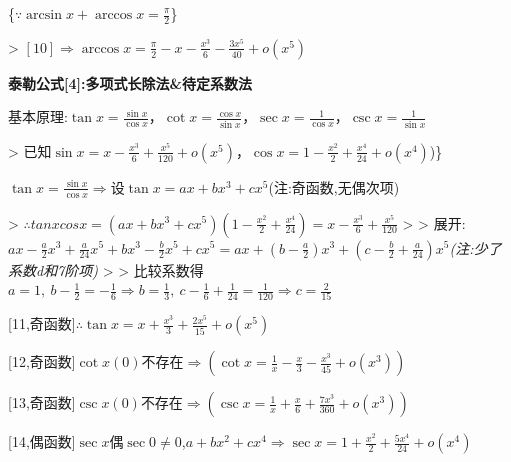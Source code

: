 \documentclass[11pt,a4paper,UTF8]{ctexart}
\begin{document}
    \{$\because\arcsin x + \arccos x = \frac{\pi}{2}$\}

\begin{solbox}[{分步推导与答题规范}]
    >   $[10]\Rightarrow \arccos x = \frac{\pi}{2} - x - \frac{x^3}{6} - \frac{3x^5}{40} + o(x^5)$
\end{solbox}

    \textbf{泰勒公式[4]:多项式长除法\&待定系数法}

    基本原理:$\tan x = \frac{\sin x}{\cos x}$，$\cot x = \frac{\cos x}{\sin x}$，$\sec x = \frac{1}{\cos x}$，$\csc x = \frac{1}{\sin x}$

\begin{solbox}[{分步推导与答题规范}]
    >   已知$\sin x = x - \frac{x^3}{6} + \frac{x^5}{120} + o(x^5)$，$\cos x = 1 - \frac{x^2}{2} + \frac{x^4}{24} + o(x^4)$)\}
\end{solbox}

    $\tan x = \frac{\sin x}{\cos x} \Rightarrow$设$\tan x = ax + bx^3 + cx^5$(注:奇函数,无偶次项)

\begin{solbox}[{分步推导与答题规范}]
    >   $\therefore tanxcosx = (ax + bx^3 + cx^5)(1 - \frac{x^2}{2} + \frac{x^4}{24}) = x - \frac{x^3}{6} + \frac{x^5}{120}$
    >
    >   展开:$ax - \frac{a}{2}x^3 + \frac{a}{24}x^5 + bx^3 - \frac{b}{2}x^5 + cx^5 = ax + (b-\frac{a}{2})x^3 + (c-\frac{b}{2}+\frac{a}{24})x^5$\textit{(注:少了系数d和7阶项)}
    >
    >   比较系数得$a=1,\ b-\frac{1}{2}=-\frac{1}{6} \Rightarrow b=\frac{1}{3},\ c-\frac{1}{6}+\frac{1}{24}=\frac{1}{120} \Rightarrow c=\frac{2}{15}$
\end{solbox}

    [11,奇函数]$\therefore \tan x = x + \frac{x^3}{3} + \frac{2x^5}{15} + o(x^5)$

    [12,奇函数]$\cot x(0)$不存在$\Rightarrow (\cot x = \frac{1}{x} - \frac{x}{3} - \frac{x^3}{45} + o(x^3))$

    [13,奇函数]$\csc x(0)$不存在$\Rightarrow (\csc x = \frac{1}{x} + \frac{x}{6} + \frac{7x^3}{360} + o(x^3))$

    [14,偶函数]$\sec x$偶$\sec 0 \neq 0$,$a + bx^2 + cx^4 \Rightarrow \sec x = 1 + \frac{x^2}{2} + \frac{5x^4}{24} + o(x^4)$
\end{document}
